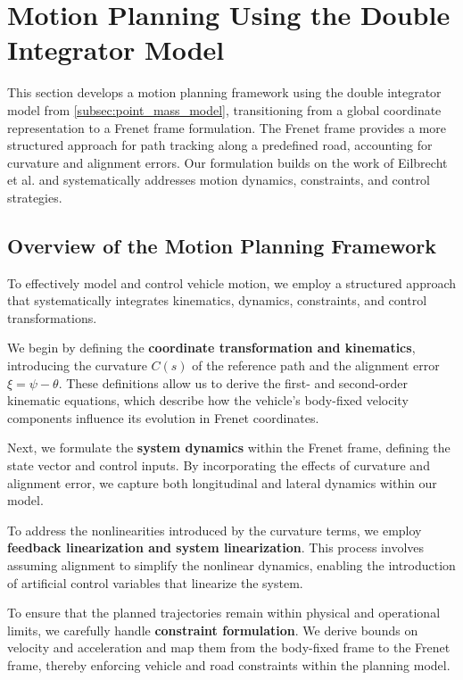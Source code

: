 \section{Motion Planning Using the Double Integrator Model} \label{sec:motion_planning_using_point_mass}

This section develops a motion planning framework using the double integrator model from \ref{subsec:point_mass_model}, transitioning from a global
coordinate representation to a Frenet frame formulation.
The Frenet frame provides a more structured approach for path tracking along a predefined road, accounting for curvature and alignment errors.
Our formulation builds on the work of Eilbrecht et al.
\cite{eilbrecht_challenges_2020} and systematically addresses motion dynamics, constraints, and control strategies.

\subsection{Overview of the Motion Planning Framework}

To effectively model and control vehicle motion, we employ a structured approach that systematically integrates kinematics, dynamics, constraints,
and control transformations.

We begin by defining the \textbf{coordinate transformation and kinematics}, introducing the curvature $C(s)$ of the reference path and the alignment
error $\xi = \psi - \theta$.
These definitions allow us to derive the first- and second-order kinematic equations, which describe how the vehicle's body-fixed velocity components
influence its evolution in Frenet coordinates.

Next, we formulate the \textbf{system dynamics} within the Frenet frame, defining the state vector and control inputs.
By incorporating the effects of curvature and alignment error, we capture both longitudinal and lateral dynamics within our model.

To address the nonlinearities introduced by the curvature terms, we employ \textbf{feedback linearization and system linearization}.
This process involves assuming alignment to simplify the nonlinear dynamics, enabling the introduction of artificial control variables that linearize
the system.

To ensure that the planned trajectories remain within physical and operational limits, we carefully handle \textbf{constraint formulation}.
We derive bounds on velocity and acceleration and map them from the body-fixed frame to the Frenet frame, thereby enforcing vehicle and road
constraints within the planning model.

